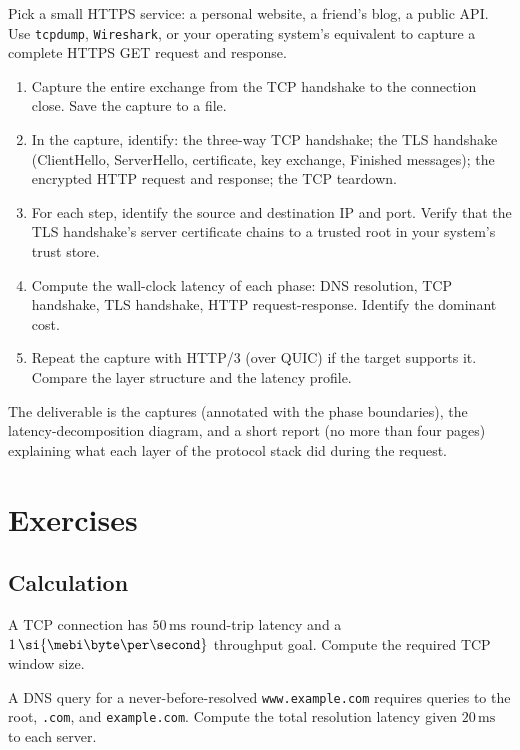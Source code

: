\begin{project}
Pick a small HTTPS service: a personal website, a friend's blog, a public API. Use \texttt{tcpdump}, \texttt{Wireshark}, or your operating system's equivalent to capture a complete HTTPS GET request and response.

\begin{enumerate}[leftmargin=*]
  \item Capture the entire exchange from the TCP handshake to the connection close. Save the capture to a file.
  \item In the capture, identify: the three-way TCP handshake; the TLS handshake (ClientHello, ServerHello, certificate, key exchange, Finished messages); the encrypted HTTP request and response; the TCP teardown.
  \item For each step, identify the source and destination IP and port. Verify that the TLS handshake's server certificate chains to a trusted root in your system's trust store.
  \item Compute the wall-clock latency of each phase: DNS resolution, TCP handshake, TLS handshake, HTTP request-response. Identify the dominant cost.
  \item Repeat the capture with HTTP/3 (over QUIC) if the target supports it. Compare the layer structure and the latency profile.
\end{enumerate}

The deliverable is the captures (annotated with the phase boundaries), the latency-decomposition diagram, and a short report (no more than four pages) explaining what each layer of the protocol stack did during the request.
\end{project}

\section{Exercises}

\subsection*{Calculation}

\begin{exercise}
A TCP connection has $50\,\si{\milli\second}$ round-trip latency and a $1\,\si{\mebi\byte\per\second}$ throughput goal. Compute the required TCP window size.
\end{exercise}

\begin{exercise}
A DNS query for a never-before-resolved \texttt{www.example.com} requires queries to the root, \texttt{.com}, and \texttt{example.com}. Compute the total resolution latency given $20\,\si{\milli\second}$ to each server.
\end{exercise}


